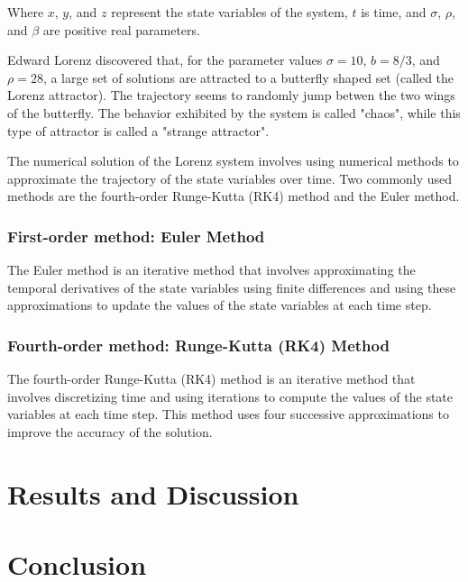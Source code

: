 \documentclass{article}
\begin{document}
Where $x$, $y$, and $z$ represent the state variables of the system, 
$t$ is time, and $\sigma$, $\rho$, and $\beta$ are positive real parameters.

Edward Lorenz discovered that, for the parameter values 
$\sigma = 10$, $b = 8/3$, and $\rho = 28$, a large set of solutions are attracted to a butterfly shaped set (called the Lorenz attractor). 
The trajectory seems to randomly jump betwen the two wings of the butterfly. 
The behavior exhibited by the system is called "chaos", while this type of attractor is called a "strange attractor". 

The numerical solution of the Lorenz system involves using numerical methods to approximate the trajectory of the state variables over time. 
Two commonly used methods are the fourth-order Runge-Kutta (RK4) method and the Euler method.

\subsubsection{First-order method: Euler Method}
The Euler method is an iterative method that involves approximating the temporal derivatives 
of the state variables using finite differences and using these approximations to update the values of the state variables at each time step. 

\subsubsection{Fourth-order method: Runge-Kutta (RK4) Method}
The fourth-order Runge-Kutta (RK4) method is an iterative method that involves discretizing 
time and using iterations to compute the values of the state variables at each time step. 
This method uses four successive approximations to improve the accuracy of the solution. 


\section{Results and Discussion}


\section{Conclusion}



\end{document}
